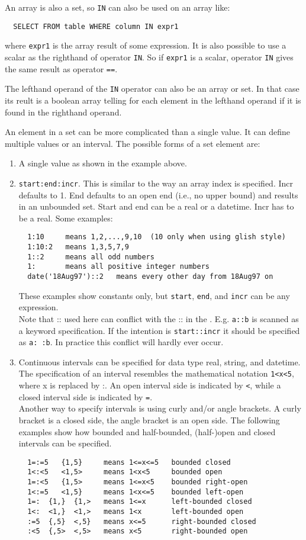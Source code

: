 An array is also a set, so \texttt{IN} can also be used on an array
like:
\begin{verbatim}
  SELECT FROM table WHERE column IN expr1
\end{verbatim}
where \texttt{expr1} is the array result of some expression.
 It is also possible to use a scalar as the
righthand of operator \texttt{IN}.
So if \texttt{expr1} is a scalar, operator \texttt{IN}
gives the same result as operator \texttt{==}.

The lefthand operand of the \texttt{IN} operator can also be an array or
set. In that case its reult is a boolean array telling for each
element in the lefthand operand if it is found in the righthand
operand.

An element in a set can be more complicated than a single value.
It can define multiple values or an interval. The possible forms of
a set element are:
\begin{enumerate}
\item A single value as shown in the example above.
\item \texttt{start:end:incr}. This is similar to the
way an array index is specified. Incr defaults to 1.
End defaults to an open end (i.e., no upper bound) and results
in an unbounded set. Start and end can be a real or a datetime.
Incr has to be a real. Some examples:
\begin{verbatim}
  1:10     means 1,2,...,9,10  (10 only when using glish style)
  1:10:2   means 1,3,5,7,9
  1::2     means all odd numbers
  1:       means all positive integer numbers
  date('18Aug97')::2   means every other day from 18Aug97 on
\end{verbatim}
These examples show constants only, but \texttt{start}, \texttt{end},
and \texttt{incr} can be any expression.
\\Note that :: used here can conflict with the :: in the
. E.g. \texttt{a::b} is scanned as
a keyword specification. If the intention is \texttt{start::incr}
it should be specified as \texttt{a: :b}. In practice this conflict
will hardly ever occur.
\item Continuous intervals can be specified for data type real, string, and datetime.
The specification of an interval resembles the mathematical notation
\texttt{1<x<5}, where x is replaced by :. An open interval side
is indicated by \texttt{<}, while a closed interval side is indicated
by \texttt{=}.
\\Another way to specify intervals is using curly and/or angle brackets.
A curly bracket is a closed side, the angle bracket is an open side.
The following examples show how bounded and half-bounded,
(half-)open and closed intervals can be specified.
\begin{verbatim}
  1=:=5   {1,5}     means 1<=x<=5   bounded closed
  1<:<5   <1,5>     means 1<x<5     bounded open
  1=:<5   {1,5>     means 1<=x<5    bounded right-open
  1<:=5   <1,5}     means 1<x<=5    bounded left-open
  1=:  {1,}  {1,>   means 1<=x      left-bounded closed
  1<:  <1,}  <1,>   means 1<x       left-bounded open
  :=5  {,5}  <,5}   means x<=5      right-bounded closed
  :<5  {,5>  <,5>   means x<5       right-bounded open
\end{verbatim}
\end{enumerate}
